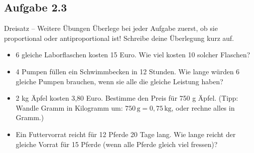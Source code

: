 \subsection*{Aufgabe 2.3} %
\begin{aufgabenumgebung}[aufg:2.3]{Dreisatz – Weitere Übungen}
Überlege bei jeder Aufgabe zuerst, ob sie proportional oder antiproportional ist! Schreibe deine Überlegung kurz auf.
\begin{itemize}
    \item 6 gleiche Laborflaschen kosten 15 Euro. Wie viel kosten 10 solcher Flaschen?
    \item 4 Pumpen füllen ein Schwimmbecken in 12 Stunden. Wie lange würden 6 gleiche Pumpen brauchen, wenn sie alle die gleiche Leistung haben?
    \item 2 kg Äpfel kosten 3,80 Euro. Bestimme den Preis für 750 g Äpfel. (Tipp: Wandle Gramm in Kilogramm um: $750\,\text{g} = 0,75\,\text{kg}$, oder rechne alles in Gramm.)
    \item Ein Futtervorrat reicht für 12 Pferde 20 Tage lang. Wie lange reicht der gleiche Vorrat für 15 Pferde (wenn alle Pferde gleich viel fressen)?
\end{itemize}
\end{aufgabenumgebung}

